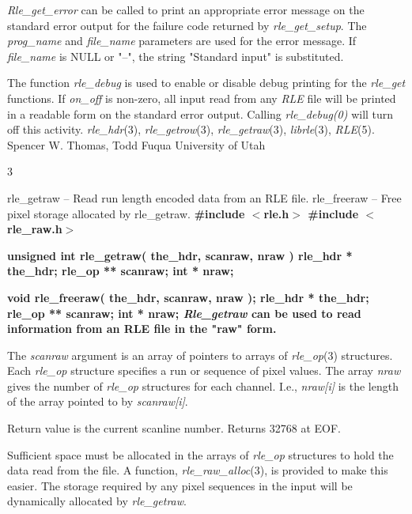 {\it Rle\_get\_error}
can be called to print an appropriate error message on the standard
error output for the failure code returned by
{\it rle\_get\_setup}{\rm .}
The 
{\it prog\_name}
and
{\it file\_name}
parameters are used for the error message.  If
{\it file\_name}
is NULL or "--", the string "Standard input" is substituted.

The function
{\it rle\_debug}
is used to enable or disable debug printing for the 
{\it rle\_get}
functions.  If 
{\it on\_off}
is non-zero, all input read from any
{\it RLE}
file will be printed in a readable form on the standard error output.
Calling
{\it rle\_debug(0)}
will turn off this activity.
{\it rle\_hdr}{\rm (3),}
{\it rle\_getrow}{\rm (3),}
{\it rle\_getraw}{\rm (3),}
{\it librle}{\rm (3),}
{\it RLE}{\rm (5).}
Spencer W. Thomas, Todd Fuqua
\nwl
University of Utah
\newpage


%
%
%
 3

rle\_getraw -- Read run length encoded data from an RLE file.
\nwl
rle\_freeraw -- Free pixel storage allocated by rle\_getraw.
\bf
\#include $<$rle.h$>$
\nwl
\bf
\#include $<$rle\_raw.h$>$
\par\vspace{1.0\baselineskip}
\bf
unsigned int rle\_getraw( the\_hdr, scanraw, nraw )
\nwl
\bf
rle\_hdr * the\_hdr;
\nwl
\bf
rle\_op ** scanraw;
\nwl
\bf
int * nraw;
\par\vspace{1.0\baselineskip}
\bf
void rle\_freeraw( the\_hdr, scanraw, nraw );
\nwl
\bf
rle\_hdr * the\_hdr;
\nwl
\bf
rle\_op ** scanraw;
\nwl
\bf
int * nraw;
{\it Rle\_getraw}
can be used to read information from an RLE file in the "raw" form.

The
{\it scanraw}
argument is an array of pointers to arrays of 
{\it rle\_op}{\rm (3)}
structures.  Each
{\it rle\_op}
structure specifies a run or sequence of pixel values.  The array
{\it nraw}
gives the number of 
{\it rle\_op}
structures for each channel.  I.e.,
{\it nraw[i]}
is the length of the array pointed to by
{\it scanraw[i]}{\rm .}
\par
Return value is the current scanline number.  Returns 32768 at EOF.
\par
Sufficient space must be allocated in the arrays of 
{\it rle\_op}
structures to hold the data read from the file.  A function,
{\it rle\_raw\_alloc}{\rm (3),}
is provided to make this easier.  The storage required by any pixel
sequences in the input will be dynamically allocated by
{\it rle\_getraw}{\rm .}

